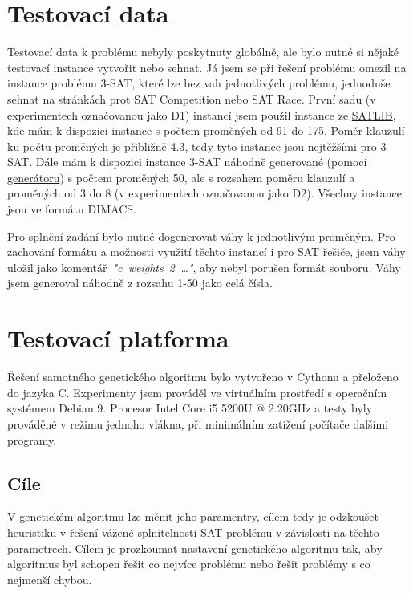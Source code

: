 \documentclass[11pt]{article}
\begin{document}
\section{Testovací data}\label{kap:data}
Testovací data k problému nebyly poskytnuty globálně, ale bylo nutné si nějaké testovací instance vytvořit nebo sehnat. Já jsem se při řešení problému omezil na instance problému 3-SAT, které lze bez vah jednotlivých problému, jednoduše sehnat na stránkách prot SAT Competition nebo SAT Race. První sadu (v experimentech označovanou jako D1) instancí jsem použil instance ze \href{https://www.cs.ubc.ca/~hoos/SATLIB/benchm.html}{SATLIB}, kde mám k dispozici instance s počtem proměných od 91 do 175. Poměr klauzulí ku počtu proměných je přibližně 4.3, tedy tyto instance jsou nejtěžšími pro 3-SAT. Dále mám k dispozici instance 3-SAT náhodně generované (pomocí \href{https://toughsat.appspot.com/}{generátoru}) s počtem proměných 50, ale s rozsahem poměru klauzulí a proměných od 3 do 8 (v experimentech označovanou jako D2). Všechny instance jsou ve formátu DIMACS. 

Pro splnění zadání bylo nutné dogenerovat váhy k jednotlivým proměným. Pro zachování for\-mátu a možnosti využití těchto instancí i pro SAT řešiče, jsem váhy uložil jako komentář~\textit{"c~weights~2~\dots"}, aby nebyl porušen formát souboru. Váhy jsem generoval náhodně z rozsahu 1-50 jako celá čísla. 

\section{Testovací platforma}\label{kap:platform}
Řešení samotného genetického algoritmu bylo vytvořeno v Cythonu a přeloženo do jazyka C. Experimenty jsem prováděl ve virtuálním prostředí s operačním systémem Debian 9. Procesor Intel Core i5 5200U @ 2.20GHz a testy byly prováděné v režimu jednoho vlákna, při minimálním zatížení počítače dalšími programy.
\subsection{Cíle}\label{kap:cil}

V genetickém algoritmu lze měnit jeho paramentry, cílem tedy je odzkoušet heuristiku v řešení vážené splnitelnosti SAT problému v závislosti na těchto parametrech. Cílem je prozkoumat nastavení genetického algoritmu tak, aby algoritmus byl schopen řešit co nejvíce problému nebo řešit problémy s co nejmenší chybou.
\end{document}
